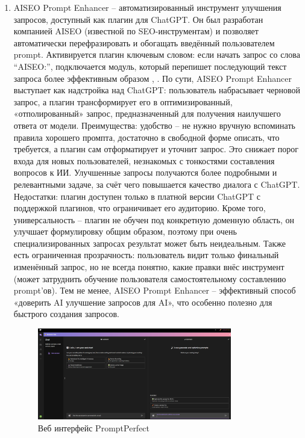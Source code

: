 \begin{enumerate}[label=\arabic*]
\item AISEO Prompt Enhancer – автоматизированный инструмент улучшения запросов, доступный как плагин для ChatGPT. Он был разработан компанией AISEO (известной по SEO-инструментам) и позволяет автоматически перефразировать и обогащать введённый пользователем prompt. Активируется плагин ключевым словом: если начать запрос со слова “AISEO:”, подключается модуль, который перепишет последующий текст запроса более эффективным образом \cite{restack:advprompt}, \cite{whatplugin:promptenhancer}. По сути, AISEO Prompt Enhancer выступает как надстройка над ChatGPT: пользователь набрасывает черновой запрос, а плагин трансформирует его в оптимизированный, «отполированный» запрос, предназначенный для получения наилучшего ответа от модели. Преимущества: удобство – не нужно вручную вспоминать правила хорошего промпта, достаточно в свободной форме описать, что требуется, а плагин сам отформатирует и уточнит запрос. Это снижает порог входа для новых пользователей, незнакомых с тонкостями составления вопросов к ИИ\cite{whatplugin:promptenhancer}. Улучшенные запросы получаются более подробными и релевантными задаче, за счёт чего повышается качество диалога с ChatGPT. Недостатки: плагин доступен только в платной версии ChatGPT с поддержкой плагинов, что ограничивает его аудиторию. Кроме того, универсальность – плагин не обучен под конкретную доменную область, он улучшает формулировку общим образом, поэтому при очень специализированных запросах результат может быть неидеальным. Также есть ограниченная прозрачность: пользователь видит только финальный изменённый запрос, но не всегда понятно, какие правки внёс инструмент (может затруднить обучение пользователя самостоятельному составлению prompt’ов). Тем не менее, AISEO Prompt Enhancer – эффективный способ «доверить AI улучшение запросов для AI», что особенно полезно для быстрого создания запросов.
\begin{figure}[htbp]
    \centering
    \includegraphics[width=0.8\textwidth]{picture/prompt-perfect.png}
    \caption{Веб интерфейс PromptPerfect}
    \label{prompt_perfect}

\end{figure}
\end{enumerate}
